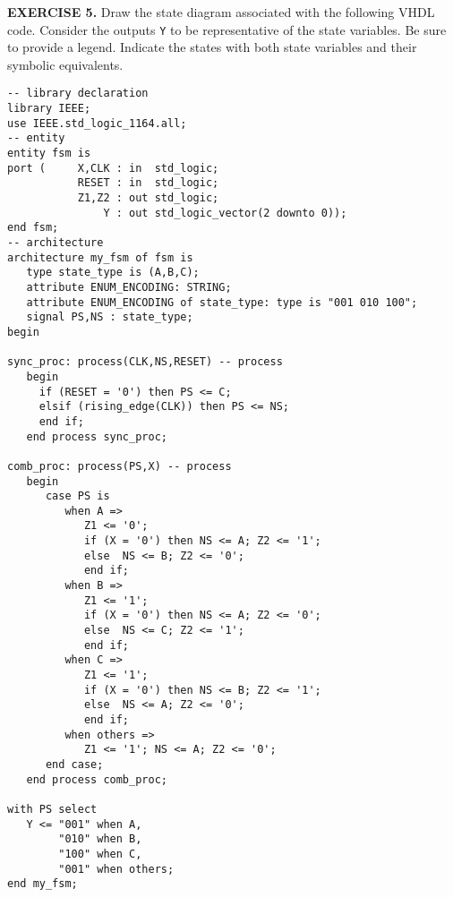 \vspace{20pt}
\noindent
\begin{minipage}{1\textwidth}
\textbf{EXERCISE 5.}
Draw the state diagram associated with the following VHDL code. Consider the outputs \texttt{Y} to be representative of the state variables. Be sure to provide a legend. Indicate the states with both state variables and their symbolic equivalents.
\end{minipage}
\begin{minipage}{1\textwidth}
\vspace{10px}
\begin{lstlisting}
-- library declaration
library IEEE;
use IEEE.std_logic_1164.all;
-- entity
entity fsm is
port (     X,CLK : in  std_logic;
           RESET : in  std_logic;
           Z1,Z2 : out std_logic;
               Y : out std_logic_vector(2 downto 0));
end fsm;
-- architecture
architecture my_fsm of fsm is
   type state_type is (A,B,C);
   attribute ENUM_ENCODING: STRING;
   attribute ENUM_ENCODING of state_type: type is "001 010 100";
   signal PS,NS : state_type;
begin

sync_proc: process(CLK,NS,RESET) -- process
   begin
     if (RESET = '0') then PS <= C;
     elsif (rising_edge(CLK)) then PS <= NS;
     end if;
   end process sync_proc;

comb_proc: process(PS,X) -- process
   begin
      case PS is
         when A =>
            Z1 <= '0';
            if (X = '0') then NS <= A; Z2 <= '1';
            else  NS <= B; Z2 <= '0';
            end if;
         when B =>
            Z1 <= '1';
            if (X = '0') then NS <= A; Z2 <= '0';
            else  NS <= C; Z2 <= '1';
            end if;
         when C =>
            Z1 <= '1';
            if (X = '0') then NS <= B; Z2 <= '1';
            else  NS <= A; Z2 <= '0';
            end if;
         when others =>
            Z1 <= '1'; NS <= A; Z2 <= '0';
      end case;
   end process comb_proc;

with PS select
   Y <= "001" when A,
        "010" when B,
        "100" when C,
        "001" when others;
end my_fsm;
\end{lstlisting}
\end{minipage}

